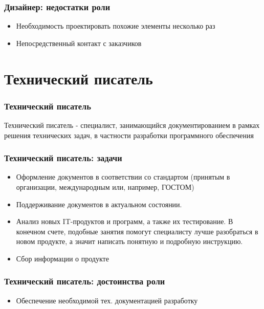 \documentclass{../industrial-development}
\begin{document}
	\begin{frame} \frametitle{Дизайнер: недостатки роли}
		\begin{block}{}
			\begin{itemize}
				\item Необходимость проектировать похожие элементы несколько раз
				\item Непосредственный контакт с заказчиков
			\end{itemize}
		\end{block}
	\end{frame}
	
	
	\section{Технический писатель }
	
	\begin{frame} \frametitle{Технический писатель}
		\begin{block}{}
			\alert {Технический писатель} - специалист, занимающийся документированием в рамках решения технических задач, в частности разработки программного обеспечения
		\end{block}
	\end{frame}

	\begin{frame} \frametitle{Технический писатель: задачи}
		\begin{block}{}
			\begin{itemize}
				\item Оформление документов в соответствии со стандартом (принятым в организации, международным или, например, ГОСТОМ)
				\item Поддерживание документов в актуальном состоянии.
				\item Анализ новых IT-продуктов и программ, а также их тестирование. В конечном счете, подобные занятия помогут специалисту лучше разобраться в новом продукте, а значит написать понятную и подробную инструкцию.
				\item  Сбор информации о продукте
			\end{itemize}
		\end{block}
	\end{frame}

	\begin{frame} \frametitle{Технический писатель:  достоинства роли}
		\begin{block}{}
			\begin{itemize}
				\item Обеспечение необходимой тех. документацией разработку
			\end{itemize}
		\end{block}
	\end{frame}
\end{document}
